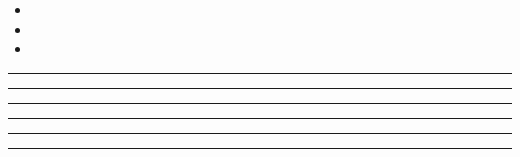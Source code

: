 \documentclass[11pt,a4paper]{article}
\begin{document}
\swarmwrapnext
\begin{itemize}
  \item \lipsum[1][1-3]
  \item \lipsum[2][1-3]
  \item \lipsum[3][1-3]
\end{itemize}
\begin{swarmwrap}%
  \begin{minipage}[t]{3cm}
    \centering
    \textcolor{red!20}{\rule{\linewidth}{8cm}}
  \end{minipage}%
\end{swarmwrap}%
\swarmwrapnext\lipsum[1]\lipsum[2]\lipsum[3]\lipsum[4]
\begin{swarmwrap}%
  \begin{minipage}[t]{4cm}
    \centering
    \textcolor{red!20}{\rule{\linewidth}{9cm}}
  \end{minipage}%
\end{swarmwrap}%
\swarmwrapnext\lipsum[1]\lipsum[2]\lipsum[3]\lipsum[4]\lipsum[5]
\begin{swarmwrap}%
  \begin{minipage}[t]{5cm}
    \centering
    \textcolor{red!20}{\rule{\linewidth}{10cm}}
  \end{minipage}%
\end{swarmwrap}%
\swarmwrapnext\lipsum[1]\lipsum[2]\lipsum[3]\lipsum[4]\lipsum[5]\lipsum[6]
\begin{swarmwrap}%
  \begin{minipage}[t]{2cm}
    \centering
    \textcolor{red!20}{\rule{\linewidth}{2cm}}
  \end{minipage}%
\end{swarmwrap}%
\swarmwrapnext\lipsum[1]
\begin{swarmwrap}%
  \begin{minipage}[t]{3cm}
    \centering
    \textcolor{red!20}{\rule{\linewidth}{3cm}}
  \end{minipage}%
\end{swarmwrap}%
\swarmwrapnext\lipsum[1]\lipsum[2]
\begin{swarmwrap}%
  \begin{minipage}[t]{4cm}
    \centering
    \textcolor{red!20}{\rule{\linewidth}{4cm}}
  \end{minipage}%
\end{swarmwrap}%
\end{document}
